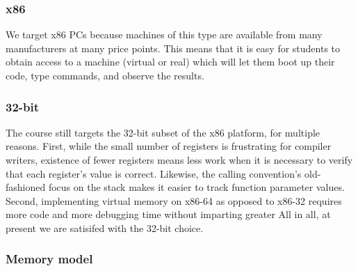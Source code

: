 \subsubsection{x86}

We target x86 PCs because machines of this type are
available from many manufacturers at many price points.
This means that it is easy for students to obtain access
to a machine (virtual or real) which will let them boot
up their code, type commands, and observe the results.

\subsubsection{32-bit}

The course still targets the 32-bit
subset of the x86 platform, for multiple reasons.
First, while the small number of registers is
frustrating for compiler writers,
existence of fewer registers means less work
when it is necessary to verify that each register's
value is correct.
Likewise, the calling convention's old-fashioned focus on the stack
makes it easier to track function parameter values.
Second, implementing virtual memory on x86-64 as
opposed to x86-32 requires more code and more
debugging time without imparting greater
All in all, at present we are satisifed with
the 32-bit choice.

\subsubsection{Memory model}

